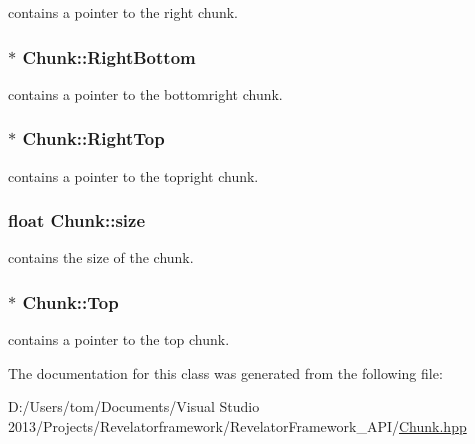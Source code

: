 contains a pointer to the right chunk. 

\hypertarget{class_chunk_afded01a9a67540c9f64dde5776021f4b}{
\subsubsection[{Right\-Bottom}]{$\ast$ Chunk\-::\-Right\-Bottom\hspace{0.3cm}{\ttfamily [private]}}}\label{class_chunk_afded01a9a67540c9f64dde5776021f4b}


contains a pointer to the bottomright chunk. 

\hypertarget{class_chunk_a8a7593c89d4fe5ed193e68b9ed40016b}{
\subsubsection[{Right\-Top}]{$\ast$ Chunk\-::\-Right\-Top\hspace{0.3cm}{\ttfamily [private]}}}\label{class_chunk_a8a7593c89d4fe5ed193e68b9ed40016b}


contains a pointer to the topright chunk. 

\hypertarget{class_chunk_af46410b580baf2985b01044d5c041b2e}{
\subsubsection[{size}]{\setlength{\rightskip}{0pt plus 5cm}float Chunk\-::size\hspace{0.3cm}{\ttfamily [private]}}}\label{class_chunk_af46410b580baf2985b01044d5c041b2e}


contains the size of the chunk. 

\hypertarget{class_chunk_ae841d5ab24dfa5ef8865cb4fa05d089d}{
\subsubsection[{Top}]{$\ast$ Chunk\-::\-Top\hspace{0.3cm}{\ttfamily [private]}}}\label{class_chunk_ae841d5ab24dfa5ef8865cb4fa05d089d}


contains a pointer to the top chunk. 



The documentation for this class was generated from the following file\-:\begin{DoxyCompactItemize}
\item 
D\-:/\-Users/tom/\-Documents/\-Visual Studio 2013/\-Projects/\-Revelatorframework/\-Revelator\-Framework\-\_\-\-A\-P\-I/\hyperlink{_chunk_8hpp}{Chunk.\-hpp}\end{DoxyCompactItemize}

